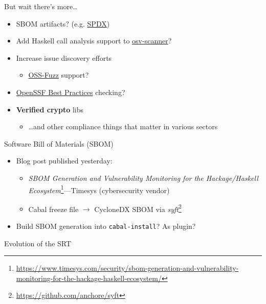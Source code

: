 \documentclass[ignorenonframetext,aspectratio=169,12pt]{beamer}
\begin{document}
\begin{frame}{But wait there's more\ldots{}}
  \begin{itemize}
    \item SBOM artifacts? (e.g. \href{https://spdx.dev/}{SPDX})
    \item Add Haskell call analysis support to
      \href{https://google.github.io/osv-scanner}{osv-scanner}?
    \item Increase issue discovery efforts
      \begin{itemize}
        \item \href{https://github.com/google/oss-fuzz}{OSS-Fuzz} support?
      \end{itemize}
    \item \href{https://www.bestpractices.dev/en/criteria/0}{OpenSSF Best Practices} checking?
    \item {\bf Verified crypto} libs
      \begin{itemize}
        \item \ldots{}and other compliance things that matter in various
          sectors
      \end{itemize}
  \end{itemize}
\end{frame}

\begin{frame}{Software Bill of Materials (SBOM)}
  \begin{itemize}
    \item Blog post published yesterday:
      \begin{itemize}
        \item {\em SBOM Generation and Vulnerability Monitoring for
          the Hackage/Haskell Ecosystem}\footnote{\url{https://www.timesys.com/security/sbom-generation-and-vulnerability-monitoring-for-the-hackage-haskell-ecosystem/}}---Timesys (cybersecurity
          vendor)
        \item Cabal freeze file $\to$ CycloneDX SBOM via
          {\em syft}\footnote{\url{https://github.com/anchore/syft}}
      \end{itemize}
    \item Build SBOM generation into {\tt cabal-install}?  As
      plugin?
  \end{itemize}
\end{frame}

\begin{frame}
\centering
\Large
  Evolution of the SRT
\end{frame}
\end{document}
